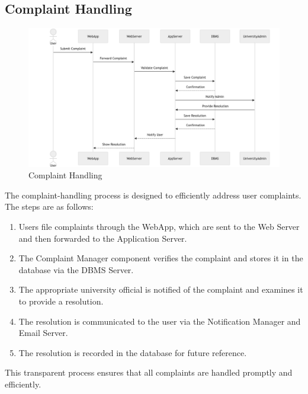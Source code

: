 \subsection{Complaint Handling}
\label{subsec:complaint_handling}
\begin{figure}[H]
    \begin{center}
        \includegraphics[width=0.82\linewidth]{JhaBhatiaSharma/imagesDD/ComplaintHandling.png}
        \caption{Complaint Handling}
        \label{fig:complainthandling}%
    \end{center}
\end{figure}
The complaint-handling process is designed to efficiently address user complaints. The steps are as follows:

\begin{enumerate}
    \item Users file complaints through the WebApp, which are sent to the Web Server and then forwarded to the Application Server.
    \item The Complaint Manager component verifies the complaint and stores it in the database via the DBMS Server.
    \item The appropriate university official is notified of the complaint and examines it to provide a resolution.
    \item The resolution is communicated to the user via the Notification Manager and Email Server.
    \item The resolution is recorded in the database for future reference.
\end{enumerate}
This transparent process ensures that all complaints are handled promptly and efficiently.

